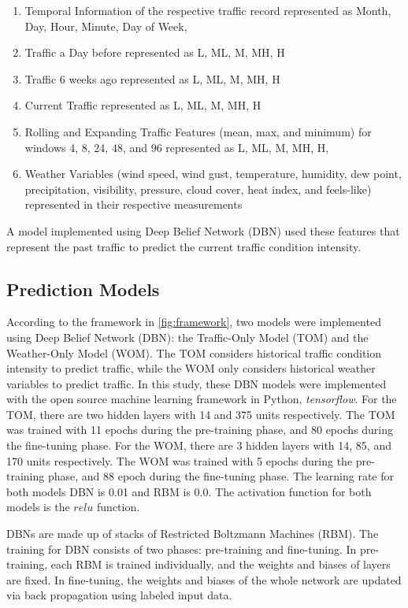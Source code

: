 \begin{enumerate}
\item Temporal Information of the respective traffic record represented as Month, Day, Hour, Minute, Day of Week,
\item Traffic a Day before represented as L, ML, M, MH, H
\item Traffic 6 weeks ago represented as L, ML, M, MH, H
\item Current Traffic represented as L, ML, M, MH, H
\item Rolling and Expanding Traffic Features (mean, max, and minimum) for windows 4, 8, 24, 48, and 96 represented as L, ML, M, MH, H,
\item Weather Variables (wind speed, wind gust, temperature, humidity, dew point, precipitation, visibility, pressure, cloud cover, heat index, and feels-like) represented in their respective measurements
\end{enumerate}

A model implemented using Deep Belief Network (DBN) used these features that represent the past traffic to predict the current traffic condition intensity.

\subsection{Prediction Models}
According to the framework in \ref{fig:framework}, two models were implemented using Deep Belief Network (DBN): the Traffic-Only Model (TOM) and the Weather-Only Model (WOM). The TOM considers historical traffic condition intensity to predict traffic, while the WOM only considers historical weather variables to predict traffic. In this study, these DBN models were implemented with the open source machine learning framework in Python, \textit{tensorflow}. For the TOM, there are two hidden layers with 14 and 375 units respectively. The TOM was trained with 11 epochs during the pre-training phase, and 80 epochs during the fine-tuning phase. For the WOM, there are 3 hidden layers with 14, 85, and 170 units respectively. The WOM was trained with 5 epochs during the pre-training phase, and 88 epoch during the fine-tuning phase. The learning rate for both models DBN is 0.01 and RBM is 0.0. The activation function for both models is the $relu$ function.

DBNs are made up of stacks of Restricted Boltzmann Machines (RBM). The training for DBN consists of two phases: pre-training and fine-tuning. In pre-training, each RBM is trained individually, and the weights and biases of layers are fixed. In fine-tuning, the weights and biases of the whole network are updated via back propagation using labeled input data.

